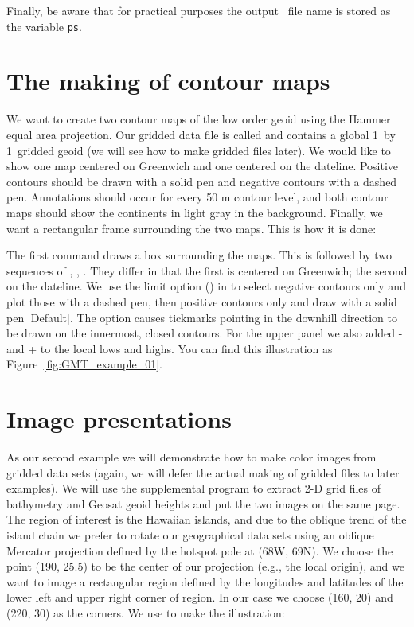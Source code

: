Finally, be aware that for practical purposes the output \PS\ file name is stored as the variable \texttt{ps}.

\section{The making of contour maps}


We want to create two contour maps of the low order geoid
using the Hammer equal area projection.  Our gridded data
file is called  and contains a global 1\DS\ 
by 1\DS\ gridded geoid (we will see how to make gridded
files later).  We would like to show one map centered on
Greenwich and one centered on the dateline.  Positive contours
should be drawn with a solid pen and negative contours with
a dashed pen.  Annotations should occur for every 50 m contour
level, and both contour maps should show the continents in
light gray in the background.  Finally, we want a rectangular
frame surrounding the two maps.  This is how it is done:


The first command draws a box surrounding the maps.  This is
followed by two sequences of
, , .
They differ in that the first is centered on Greenwich; the
second on the dateline.  We use the limit option ()
in  to select negative contours only and plot
those with a dashed pen, then positive contours only and draw
with a solid pen [Default].  The  option causes tickmarks
pointing in the downhill direction to be drawn on the innermost,
closed contours.  For the upper panel we also added - and + to
the local lows and highs.  You can find this illustration as
Figure~\ref{fig:GMT_example_01}.



\section{Image presentations}

As our second example we will demonstrate how to make color
images from gridded data sets (again, we will defer the
actual making of gridded files to later examples).  We will
use the supplemental program  to extract 2-D
grid files of bathymetry and Geosat geoid heights and put the
two images on the same page.  The region of interest is the
Hawaiian islands, and due to the oblique trend of the island
chain we prefer to rotate our geographical data sets using
an oblique Mercator projection defined by the hotspot pole
at (68\DS W, 69\DS N).  We choose the point (190\DS ,
25.5\DS ) to be the center of our projection (e.g., the
local origin), and we want to image a rectangular region
defined by the longitudes and latitudes of the lower left
and upper right corner of region.  In our case we choose
(160\DS , 20\DS ) and (220\DS , 30\DS ) as the
corners.  We use  to make the illustration:

